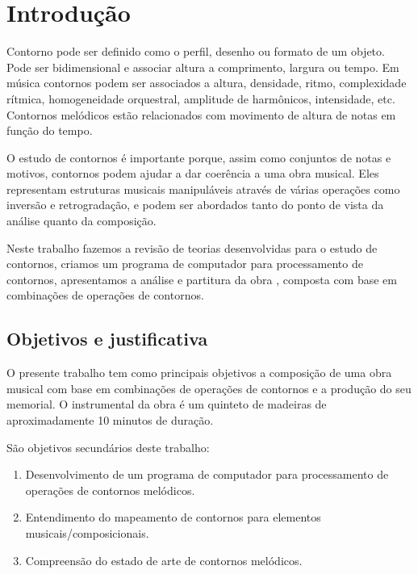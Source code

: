 \chapter{Introdução}
\label{cha:introducao}

Contorno pode ser definido como o perfil, desenho ou formato de um
objeto. Pode ser bidimensional e associar altura a comprimento,
largura ou tempo. Em música contornos podem ser associados a altura,
densidade, ritmo, complexidade rítmica, homogeneidade orquestral,
amplitude de harmônicos, intensidade, etc. Contornos melódicos estão
relacionados com movimento de altura de notas em função do tempo.

O estudo de contornos é importante porque, assim como conjuntos de
notas e motivos, contornos podem ajudar a dar coerência a uma obra
musical. Eles representam estruturas musicais manipuláveis através de
várias operações como inversão e retrogradação, e podem ser abordados
tanto do ponto de vista da análise quanto da composição.


Neste trabalho fazemos a revisão de teorias desenvolvidas para o
estudo de contornos, criamos um programa de computador para
processamento de contornos, apresentamos a análise e partitura da obra
\obra{}, composta com base em combinações de operações de contornos.

\section{Objetivos e justificativa}
\label{sec:objet-e-just}

O presente trabalho tem como principais objetivos a composição de uma
obra musical com base em combinações de operações de contornos e a
produção do seu memorial. O instrumental da obra é um quinteto de
madeiras de aproximadamente 10 minutos de duração.

São objetivos secundários deste trabalho:

\begin{enumerate}
\item Desenvolvimento de um programa de computador para processamento
  de operações de contornos melódicos.
\item Entendimento do mapeamento de contornos para elementos
  musicais/composicionais.
\item Compreensão do estado de arte de contornos melódicos.
\end{enumerate}


